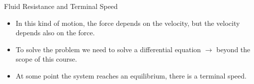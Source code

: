 \documentclass[]{beamer}
\begin{document}

\begin{frame}
  Fluid Resistance and Terminal Speed
 \vspace{3mm}


\begin{itemize}
  \item In this kind of motion, the force depends on the velocity, but the velocity depends also on the force.
 \pause
  \item To solve the problem we need to solve a differential equation $\rightarrow$ beyond the scope of this course.
\pause
  \item At some point the system reaches an equilibrium, there is a terminal speed. 
\end{itemize}





  
   \end{frame}





\end{document}
